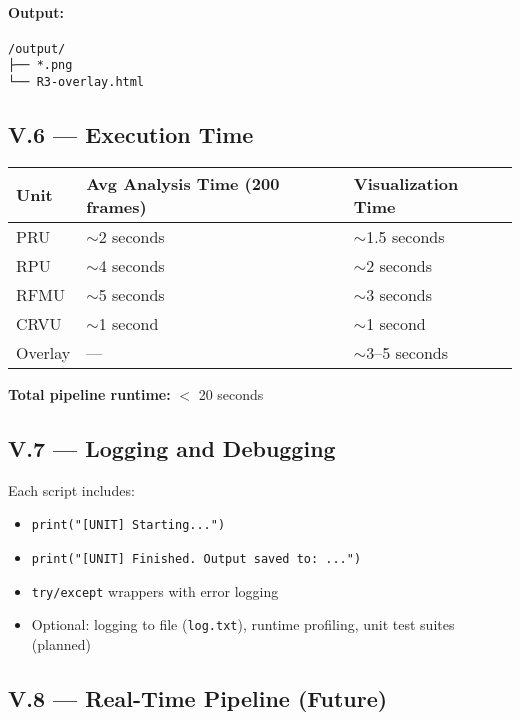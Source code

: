 \paragraph{Output:}
\begin{verbatim}
/output/
├── *.png
└── R3-overlay.html
\end{verbatim}

\subsection*{V.6 — Execution Time}

\begin{center}
\begin{tabular}{|l|l|l|}
\hline
\textbf{Unit} & \textbf{Avg Analysis Time (200 frames)} & \textbf{Visualization Time} \\
\hline
PRU & $\sim$2 seconds & $\sim$1.5 seconds \\
RPU & $\sim$4 seconds & $\sim$2 seconds \\
RFMU & $\sim$5 seconds & $\sim$3 seconds \\
CRVU & $\sim$1 second & $\sim$1 second \\
Overlay & — & $\sim$3–5 seconds \\
\hline
\end{tabular}
\end{center}

\textbf{Total pipeline runtime:} $<$ 20 seconds

\subsection*{V.7 — Logging and Debugging}

Each script includes:

\begin{itemize}
    \item \texttt{print("[UNIT] Starting...")}
    \item \texttt{print("[UNIT] Finished. Output saved to: ...")}
    \item \texttt{try/except} wrappers with error logging
    \item Optional: logging to file (\texttt{log.txt}), runtime profiling, unit test suites (planned)
\end{itemize}

\subsection*{V.8 — Real-Time Pipeline (Future)}

